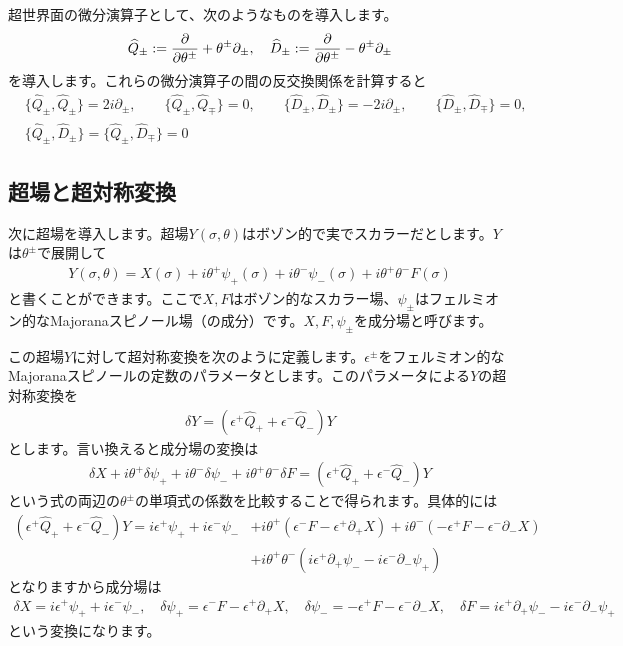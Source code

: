 \documentclass[report,paper=a4, fontsize=12pt, line_length=16cm, number_of_lines=33,dvipdfmx]{jlreq}
\numberwithin{equation}{chapter}
\numberwithin{equation}{section}
\newcommand{\del}{\partial}
\newcommand{\Qd}{\widehat{Q}}
\newcommand{\Dd}{\widehat{D}}
\begin{document}
超世界面の微分演算子として、次のようなものを導入します。
\begin{align}
  \Qd_{\pm}:=\pdv{\theta^{\pm}}+\theta^{\pm}\del_{\pm},\quad
  \Dd_{\pm}:=\pdv{\theta^{\pm}}-\theta^{\pm}\del_{\pm}
\end{align}
を導入します。これらの微分演算子の間の反交換関係を計算すると
\begin{align}
&  \{\Qd_{\pm},\Qd_{\pm}\}=2i\del_{\pm},\qquad 
  \{\Qd_{\pm},\Qd_{\mp}\}=0,\qquad 
  \{\Dd_{\pm},\Dd_{\pm}\}=-2i\del_{\pm},\qquad 
  \{\Dd_{\pm},\Dd_{\mp}\}=0,\nonumber\\
& \{\Qd_{\pm},\Dd_{\pm}\}=\{\Qd_{\pm},\Dd_{\mp}\}=0
\end{align}

\subsection{超場と超対称変換}
次に超場を導入します。超場$Y(\sigma,\theta)$はボゾン的で実でスカラーだとします。$Y$は$\theta^{\pm}$で展開して
\begin{align}
  Y(\sigma,\theta)=X(\sigma)+i\theta^{+}\psi_{+}(\sigma)+i\theta^{-}\psi_{-}(\sigma)+i\theta^{+}\theta^{-}F(\sigma)
\end{align}
と書くことができます。ここで$X,F$はボゾン的なスカラー場、$\psi_{\pm}$はフェルミオン的なMajoranaスピノール場（の成分）です。$X,F,\psi_{\pm}$を成分場と呼びます。

この超場$Y$に対して超対称変換を次のように定義します。$\epsilon^{\pm}$をフェルミオン的なMajoranaスピノールの定数のパラメータとします。このパラメータによる$Y$の超対称変換を
\begin{align}
  \delta Y = (\epsilon^{+}\Qd_{+}+\epsilon^{-}\Qd_{-})Y\label{superfieldtransf}
\end{align}
とします。言い換えると成分場の変換は
\begin{align}
  \delta X+i\theta^{+}\delta \psi_{+}+i\theta^{-}\delta \psi_{-}+i\theta^{+}\theta^{-}\delta F = (\epsilon^{+}\Qd_{+}+\epsilon^{-}\Qd_{-})Y
\end{align}
という式の両辺の$\theta^{\pm}$の単項式の係数を比較することで得られます。具体的には
\begin{align}
  (\epsilon^{+}\Qd_{+}+\epsilon^{-}\Qd_{-})Y=i\epsilon^{+}\psi_{+}+i\epsilon^{-}\psi_{-} 
  &+ i\theta^{+}(\epsilon^{-}F-\epsilon^{+}\del_{+}X)
  + i\theta^{-}(-\epsilon^{+}F-\epsilon^{-}\del_{-}X)\nonumber\\
  &+i\theta^{+}\theta^{-}
  (i\epsilon^{+}\del_{+}\psi_{-}-i\epsilon^{-}\del_{-}\psi_{+})
\end{align}
となりますから成分場は
\begin{align}
  \delta X=i\epsilon^{+}\psi_{+}+i\epsilon^{-}\psi_{-} ,\quad
  \delta \psi_{+}=\epsilon^{-}F-\epsilon^{+}\del_{+}X,\quad
  \delta \psi_{-}=-\epsilon^{+}F-\epsilon^{-}\del_{-}X,\quad
  \delta F=i\epsilon^{+}\del_{+}\psi_{-}-i\epsilon^{-}\del_{-}\psi_{+}
\end{align}
という変換になります。
\end{document}
